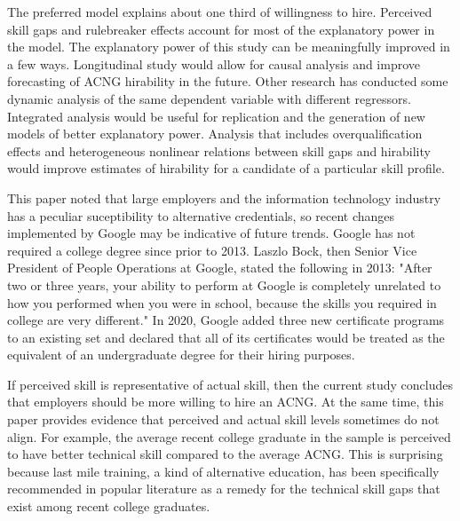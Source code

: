 \documentclass[review]{elsarticle}
\begin{document}
The preferred model explains about one third of willingness to hire.
Perceived skill gaps and rulebreaker effects account for most of the explanatory power in the model.
The explanatory power of this study can be meaningfully improved in a few ways.
Longitudinal study would allow for causal analysis and improve forecasting of ACNG hirability in the future.
Other research has conducted some dynamic analysis of the same dependent variable with different regressors\cite{vandivier2020preliminary}.
Integrated analysis would be useful for replication and the generation of new models of better explanatory power.
Analysis that includes overqualification effects and heterogeneous nonlinear relations between skill gaps and hirability would improve estimates of hirability for a candidate of a particular skill profile.

This paper noted that large employers and the information technology industry has a peculiar suceptibility to alternative credentials,
so recent changes implemented by Google may be indicative of future trends.
Google has not required a college degree since prior to 2013\cite{bryant2013head}.
Laszlo Bock, then Senior Vice President of People Operations at Google, stated the following in 2013:
"After two or three years, your ability to perform at Google is completely unrelated to how you performed when you were in school, because the skills you required in college are very different."
In 2020, Google added three new certificate programs to an existing set and declared that all of its certificates would be treated as the equivalent of an undergraduate degree for their hiring purposes\cite{hess_2020}.

If perceived skill is representative of actual skill,
then the current study concludes that employers should be more willing to hire an ACNG.
At the same time, this paper provides evidence that perceived and actual skill levels sometimes do not align.
For example, the average recent college graduate in the sample is perceived to have better technical skill compared to the average ACNG.
This is surprising because last mile training, a kind of alternative education, has been specifically recommended in popular literature as a remedy for the technical skill gaps that exist among recent college graduates.
\end{document}
